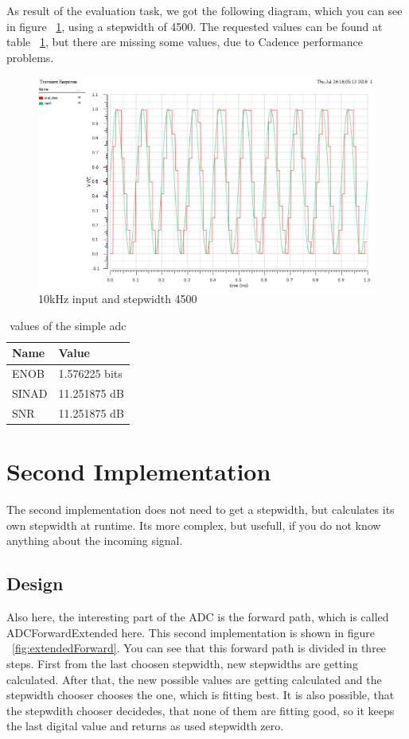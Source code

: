 As result of the evaluation task, we got the following diagram, which you can see in figure ~\ref{fig:simpleAdcEvaluation}, using a stepwidth of 4500. The requested values can be found at table ~\ref{table:valuesSimpleADC}, but there are missing some values, due to Cadence performance problems.

\begin{figure}[h]
	\centering
	\includegraphics[scale=0.5]{images/adc/10KHzInputStepWidth4500.png}
	\caption{10kHz input and stepwidth 4500}
	\label{fig:simpleAdcEvaluation}
\end{figure}

\begin{table}[!h]
	\centering
	\begin{tabular}{|l|l|}
		\hline
		Name & Value \\
		\hline
		ENOB & 1.576225 bits \\
		SINAD & 11.251875 dB \\
		SNR & 11.251875 dB \\
		\hline
	\end{tabular}
	\caption{values of the simple adc}
	\label{table:valuesSimpleADC}
\end{table}

\section{Second Implementation}

The second implementation does not need to get a stepwidth, but calculates its own stepwidth at runtime. Its more complex, but usefull, if you do not know anything about the incoming signal.

\subsection{Design}
Also here, the interesting part of the ADC is the forward path, which is called ADCForwardExtended here. This second implementation is shown in figure ~\ref{fig:extendedForward}. You can see that this forward path is divided in three steps. First from the last choosen stepwidth, new stepwidths are getting calculated. After that, the new possible values are getting calculated and the stepwidth chooser chooses the one, which is fitting best. It is also possible, that the stepwdith chooser decidedes, that none of them are fitting good, so it keeps the last digital value and returns as used stepwidth zero.

